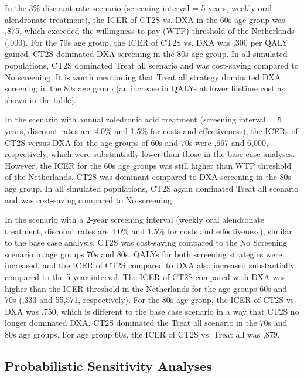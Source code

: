 In the 3\% discount rate scenario (screening interval = 5 years, weekly oral alendronate treatment), the ICER of CT2S vs. DXA in the 60s age group was ,875, which exceeded the willingness-to-pay (WTP) threshold of the Netherlands (,000). For the 70s age group,  the ICER of CT2S vs. DXA was ,300 per QALY gained. CT2S dominated DXA screening in the 80s age group. In all simulated populations, CT2S dominated Treat all scenario and was cost-saving compared to No screening. It is worth mentioning that Treat all strategy dominated DXA screening in the 80s age group (an increase in QALYs at lower lifetime cost as shown in the table). 

In the scenario with annual zoledronic acid treatment (screening interval = 5 years, discount rates are 4.0\% and 1.5\% for costs and effectiveness), the ICERs of CT2S versus DXA for the age groups of 60s and 70s were ,667 and 6,000, respectively, which were substantially lower than those in the base case analyses. However, the ICER for the 60s age groups was still higher than WTP threshold of the Netherlands. CT2S was dominant compared to DXA screening in the 80s age group. In all simulated populations, CT2S again dominated Treat all scenario and was cost-saving compared to No screening. 

In the scenario with a 2-year screening interval (weekly oral alendronate treatment, discount rates are 4.0\% and 1.5\% for costs and effectiveness), similar to the base case analysis, CT2S was cost-saving compared to the  No Screening scenario in age groups 70s and 80s. QALYs for both screening strategies were increased, and the ICER of CT2S compared to DXA also increased substantially compared to the 5-year interval. The ICER of CT2S compared with DXA was higher than the ICER threshold in the Netherlands for the age groups 60s and 70s (,333 and 55,571, respectively). For the 80s age group, the ICER of CT2S vs. DXA was ,750, which is different to the base case scenario in a way that CT2S no longer dominated DXA. CT2S dominated the Treat all scenario in the 70s and 80s age groups. For age group 60s, the ICER of CT2S vs. Treat all was ,879. 

\subsection{Probabilistic Sensitivity Analyses}

